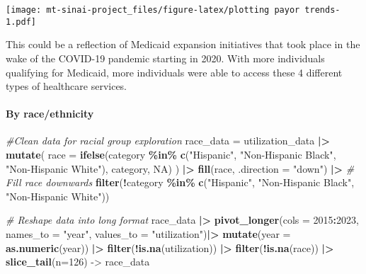 \documentclass[
]{article}
\newenvironment{Shaded}{\begin{snugshade}}{\end{snugshade}}
\newcommand{\AttributeTok}[1]{\textcolor[rgb]{0.13,0.29,0.53}{#1}}
\newcommand{\CommentTok}[1]{\textcolor[rgb]{0.56,0.35,0.01}{\textit{#1}}}
\newcommand{\ConstantTok}[1]{\textcolor[rgb]{0.56,0.35,0.01}{#1}}
\newcommand{\DecValTok}[1]{\textcolor[rgb]{0.00,0.00,0.81}{#1}}
\newcommand{\FunctionTok}[1]{\textcolor[rgb]{0.13,0.29,0.53}{\textbf{#1}}}
\newcommand{\NormalTok}[1]{#1}
\newcommand{\OtherTok}[1]{\textcolor[rgb]{0.56,0.35,0.01}{#1}}
\newcommand{\SpecialCharTok}[1]{\textcolor[rgb]{0.81,0.36,0.00}{\textbf{#1}}}
\newcommand{\StringTok}[1]{\textcolor[rgb]{0.31,0.60,0.02}{#1}}
\begin{document}
\texttt{[image: mt-sinai-project\_files/figure-latex/plotting payor trends-1.pdf]}

This could be a reflection of Medicaid expansion initiatives that took
place in the wake of the COVID-19 pandemic starting in 2020. With more
individuals qualifying for Medicaid, more individuals were able to
access these 4 different types of healthcare services.

\hypertarget{by-raceethnicity}{%
\paragraph{By race/ethnicity}\label{by-raceethnicity}}

\begin{Shaded}
\begin{Highlighting}[]
\CommentTok{\#Clean data for racial group exploration}
\NormalTok{race\_data }\OtherTok{=} 
\NormalTok{  utilization\_data }\SpecialCharTok{|\textgreater{}}
  \FunctionTok{mutate}\NormalTok{(}
    \AttributeTok{race =} \FunctionTok{ifelse}\NormalTok{(category }\SpecialCharTok{\%in\%} \FunctionTok{c}\NormalTok{(}\StringTok{"Hispanic"}\NormalTok{, }\StringTok{"Non{-}Hispanic Black"}\NormalTok{, }\StringTok{"Non{-}Hispanic White"}\NormalTok{), category, }\ConstantTok{NA}\NormalTok{)}
\NormalTok{  ) }\SpecialCharTok{|\textgreater{}} 
  \FunctionTok{fill}\NormalTok{(race, }\AttributeTok{.direction =} \StringTok{"down"}\NormalTok{) }\SpecialCharTok{|\textgreater{}}  \CommentTok{\# Fill race downwards}
  \FunctionTok{filter}\NormalTok{(}\SpecialCharTok{!}\NormalTok{category }\SpecialCharTok{\%in\%} \FunctionTok{c}\NormalTok{(}\StringTok{"Hispanic"}\NormalTok{, }\StringTok{"Non{-}Hispanic Black"}\NormalTok{, }\StringTok{"Non{-}Hispanic White"}\NormalTok{)) }

\CommentTok{\# Reshape data into long format}
\NormalTok{race\_data }\SpecialCharTok{|\textgreater{}}
  \FunctionTok{pivot\_longer}\NormalTok{(}\AttributeTok{cols =} \StringTok{\textasciigrave{}}\AttributeTok{2015}\StringTok{\textasciigrave{}}\SpecialCharTok{:}\StringTok{\textasciigrave{}}\AttributeTok{2023}\StringTok{\textasciigrave{}}\NormalTok{, }\AttributeTok{names\_to =} \StringTok{"year"}\NormalTok{, }\AttributeTok{values\_to =} \StringTok{"utilization"}\NormalTok{)}\SpecialCharTok{|\textgreater{}}
  \FunctionTok{mutate}\NormalTok{(}\AttributeTok{year =} \FunctionTok{as.numeric}\NormalTok{(year)) }\SpecialCharTok{|\textgreater{}}
  \FunctionTok{filter}\NormalTok{(}\SpecialCharTok{!}\FunctionTok{is.na}\NormalTok{(utilization)) }\SpecialCharTok{|\textgreater{}}
  \FunctionTok{filter}\NormalTok{(}\SpecialCharTok{!}\FunctionTok{is.na}\NormalTok{(race)) }\SpecialCharTok{|\textgreater{}}
  \FunctionTok{slice\_tail}\NormalTok{(}\AttributeTok{n=}\DecValTok{126}\NormalTok{) }\OtherTok{{-}\textgreater{}}\NormalTok{ race\_data}
\end{Highlighting}
\end{Shaded}
\end{document}
